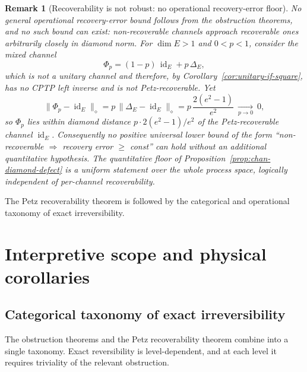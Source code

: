 \documentclass[11pt]{article}
\newtheorem{remark}[theorem]{Remark}
\DeclareMathOperator{\id}{id}
\begin{document}
\begin{remark}[Recoverability is not robust: no operational recovery-error floor]
\label{rem:recovery-not-robust}
No general operational recovery-error bound follows from the obstruction
theorems, and no such bound can exist: non-recoverable channels approach
recoverable ones arbitrarily closely in diamond norm. For $\dim E>1$ and
$0<p<1$, consider the mixed channel
\[
\Phi_p=(1-p)\,\id_E+p\,\Delta_E ,
\]
which is not a unitary channel and therefore, by
Corollary~\ref{cor:unitary-if-square}, has no CPTP left inverse and is not
Petz-recoverable. Yet
\[
\|\Phi_p-\id_E\|_\diamond
=p\,\|\Delta_E-\id_E\|_\diamond
=p\,\frac{2(e^2-1)}{e^2}\ \xrightarrow[p\to0]{}\ 0 ,
\]
so $\Phi_p$ lies within diamond distance $p\cdot 2(e^2-1)/e^2$ of the
Petz-recoverable channel $\id_E$. Consequently no positive universal lower bound
of the form ``non-recoverable $\Rightarrow$ recovery error $\ge$ const'' can hold
without an additional quantitative hypothesis. The quantitative floor of
Proposition~\ref{prop:chan-diamond-defect} is a uniform statement over the whole
process space, logically independent of per-channel recoverability.
\end{remark}

The Petz recoverability theorem is followed by the categorical and operational
taxonomy of exact irreversibility.

\section{Interpretive scope and physical corollaries}
\label{sec:scope}

\subsection{Categorical taxonomy of exact irreversibility}

The obstruction theorems and the Petz recoverability theorem combine into a
single taxonomy. Exact reversibility is level-dependent, and at each level
it requires triviality of the relevant obstruction.
\end{document}
